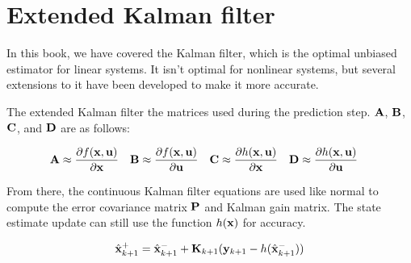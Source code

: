 \section{Extended Kalman filter}

In this book, we have covered the Kalman filter, which is the optimal unbiased
estimator for linear \glspl{system}. It isn't optimal for nonlinear
\glspl{system}, but several extensions to it have been developed to make it more
accurate.

The extended Kalman filter  the matrices used
during the prediction step. $\mathbf{A}$, $\mathbf{B}$, $\mathbf{C}$, and $\mathbf{D}$ are
 as follows:

\begin{align*}
  \mathbf{A} &\approx
    \frac{\partial f(\mathbf{x}, \mathbf{u})}{\partial \mathbf{x}} &
  \mathbf{B} &\approx
    \frac{\partial f(\mathbf{x}, \mathbf{u})}{\partial \mathbf{u}} &
  \mathbf{C} &\approx
    \frac{\partial h(\mathbf{x}, \mathbf{u})}{\partial \mathbf{x}} &
  \mathbf{D} &\approx
    \frac{\partial h(\mathbf{x}, \mathbf{u})}{\partial \mathbf{u}}
\end{align*}

From there, the continuous Kalman filter equations are used like normal to
compute the error covariance matrix $\mathbf{P}$ and Kalman gain matrix. The
\gls{state} estimate update can still use the function $h(\mathbf{x})$ for
accuracy.

\begin{equation*}
  \hat{\mathbf{x}}_{k+1}^+ = \hat{\mathbf{x}}_{k+1}^- +
    \mathbf{K}_{k+1}(\mathbf{y}_{k+1} - h(\hat{\mathbf{x}}_{k+1}^-))
\end{equation*}
